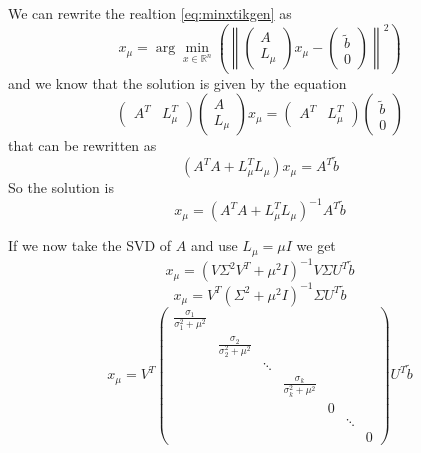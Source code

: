 \documentclass[a4paper,10pt]{article}
\theoremstyle{plain}
\theoremstyle{definition}
\theoremstyle{remark}
\newcommand{\pa}[1]{\left(#1\right)}
\newcommand{\norm}[1]{\left\|#1\right\|}
\begin{document}
We can rewrite the realtion \ref{eq:minxtikgen} as
\begin{equation*}
  x_\mu = \arg\min _{x \in \mathbb{R}^n} \pa{ \norm{ 
      \begin{pmatrix}
        A \\
        L_\mu
      \end{pmatrix}
      x_\mu -
      \begin{pmatrix}
        \tilde b\\
        0
      \end{pmatrix}
      }^2 }
\end{equation*}
and we know that the solution is given by the equation
\begin{equation*}
  \begin{pmatrix}
    A^T & L_\mu ^T
  \end{pmatrix}
  \begin{pmatrix}
    A \\
    L_\mu
  \end{pmatrix}
  x_\mu = 
  \begin{pmatrix}
    A^T & L_\mu ^T
  \end{pmatrix}
  \begin{pmatrix}
    \tilde b\\
    0
  \end{pmatrix}
\end{equation*}
that can be rewritten as
\begin{equation*}
  \pa{ A^T A + L_\mu^T L_\mu } x_\mu = A^T \tilde b 
\end{equation*}
So the solution is
\begin{equation}
  \label{eq:xtikigen}
  x_\mu = \pa{ A^T A + L_\mu^T L_\mu }^{-1} A^T \tilde b
\end{equation}

If we now take the SVD of $A$ and use $L_\mu = \mu I$ we get
\[  x_\mu = \pa{ V \Sigma ^2 V^T + \mu ^2 I }^{-1} V \Sigma U^T \tilde b  \]
\[  x_\mu = V^T \pa{\Sigma ^2 + \mu ^2 I }^{-1} \Sigma U^T \tilde b \]
\[  x_\mu = V^T
  \begin{pmatrix}
    \frac{\sigma _1 }{\sigma _1 ^2 + \mu ^2} \\
    & \frac{\sigma _2 }{\sigma _2 ^2 + \mu ^2} \\
    & & \ddots \\
    & & & \frac{\sigma _k }{\sigma _k ^2 + \mu ^2}\\
    & & & & 0\\
    & & & & & \ddots \\
    & & & & & & 0
  \end{pmatrix}
  U^T \tilde  b \]
\end{document}

